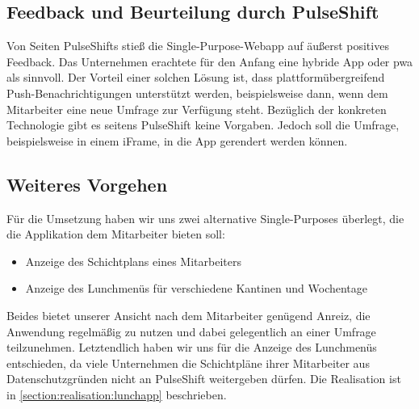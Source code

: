 \subsection{Feedback und Beurteilung durch PulseShift}

Von Seiten PulseShifts stieß die Single-Purpose-Webapp auf äußerst positives Feedback. Das Unternehmen erachtete für den Anfang eine hybride App oder \gls{pwa} als sinnvoll. Der Vorteil einer solchen Lösung ist, dass plattformübergreifend Push-Benachrichtigungen unterstützt werden, beispielsweise dann, wenn dem Mitarbeiter eine neue Umfrage zur Verfügung steht. Bezüglich der konkreten Technologie gibt es seitens PulseShift keine Vorgaben. Jedoch soll die Umfrage, beispielsweise in einem iFrame, in die App gerendert werden können.


\subsection{Weiteres Vorgehen}

Für die Umsetzung haben wir uns zwei alternative Single-Purposes überlegt, die die Applikation dem Mitarbeiter bieten soll:

\begin{itemize}
\item Anzeige des Schichtplans eines Mitarbeiters
\item Anzeige des Lunchmenüs für verschiedene Kantinen und Wochentage
\end{itemize}

Beides bietet unserer Ansicht nach dem Mitarbeiter genügend Anreiz, die Anwendung regelmäßig zu nutzen und dabei gelegentlich an einer Umfrage teilzunehmen. Letztendlich haben wir uns für die Anzeige des Lunchmenüs entschieden, da viele Unternehmen die Schichtpläne ihrer Mitarbeiter aus Datenschutzgründen nicht an PulseShift weitergeben dürfen. Die Realisation ist in \vref{section:realisation:lunchapp} beschrieben.